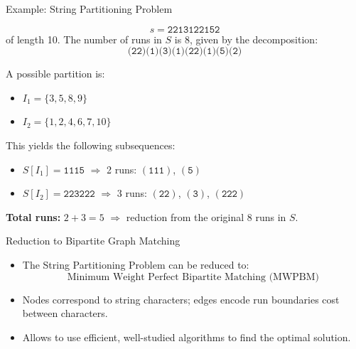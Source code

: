 \documentclass[aspectratio=169]{beamer}
\begin{document}
\begin{frame}{Example: String Partitioning Problem}
\small 

\[
s = \texttt{2213122152}
\]
of length 10.  
The number of runs in $S$ is 8, given by the decomposition:
\[
\texttt{(22)(1)(3)(1)(22)(1)(5)(2)}
\]

A possible partition is:
\begin{itemize}
  \item $I_1 = \{3, 5, 8, 9\}$
  \item $I_2 = \{1, 2, 4, 6, 7, 10\}$
\end{itemize}

This yields the following subsequences:
\begin{itemize}
  \item $S[I_1] = \texttt{1115}$  
        $\Rightarrow$ 2 runs: $(\texttt{111})$, $(\texttt{5})$
  \item $S[I_2] = \texttt{223222}$  
        $\Rightarrow$ 3 runs: $(\texttt{22})$, $(\texttt{3})$, $(\texttt{222})$
\end{itemize}

\textbf{Total runs:} $2 + 3 = 5$  
$\Rightarrow$ reduction from the original 8 runs in $S$.
\end{frame}

\begin{frame}{Reduction to Bipartite Graph Matching}
  \begin{itemize}
    \item The String Partitioning Problem can be reduced to:
      \[
        \text{Minimum Weight Perfect Bipartite Matching (MWPBM)}
      \]
    \item Nodes correspond to string characters; edges encode run boundaries cost between characters.
    \item Allows to use efficient, well-studied algorithms to find the optimal solution.
  \end{itemize}
\end{frame}
\end{document}
